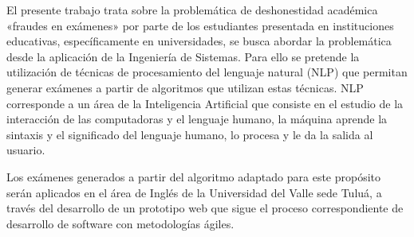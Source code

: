 \documentclass[../Main.tex]{subfiles}
\begin{document}
\begin{justify}
    El presente trabajo trata sobre la problemática de deshonestidad académica «fraudes en exámenes» por parte de los estudiantes presentada en instituciones educativas, específicamente en universidades, se busca abordar la problemática desde la aplicación de la Ingeniería de Sistemas. Para ello se pretende la utilización de técnicas de procesamiento del lenguaje natural (NLP) que permitan generar exámenes a partir de algoritmos que utilizan estas técnicas. NLP corresponde a un área de la Inteligencia Artificial que consiste en el estudio de la interacción de las computadoras y el lenguaje humano,  la máquina aprende la sintaxis y el significado del lenguaje humano, lo procesa y le da la salida al usuario.
\end{justify}

\begin{justify}
    Los exámenes generados a partir del algoritmo adaptado para este propósito serán aplicados en el área de Inglés de la Universidad del Valle sede Tuluá, a través del desarrollo de un prototipo web que sigue el proceso correspondiente de desarrollo de software con metodologías ágiles.
\end{justify}
\end{document}
